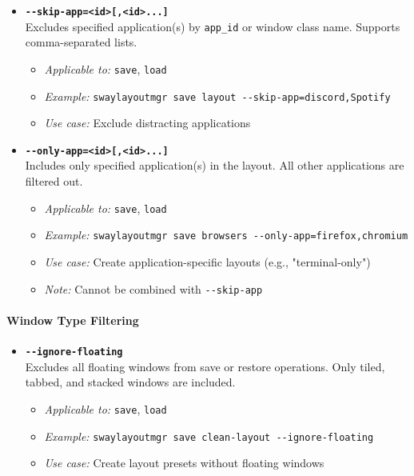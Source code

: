 \begin{itemize}
    \item \textbf{\texttt{-{}-skip-app=<id>[,<id>...]}} \\
    Excludes specified application(s) by \texttt{app\_id} or window class name. Supports comma-separated lists.
    \begin{itemize}
        \item \textit{Applicable to:} \texttt{save}, \texttt{load}
        \item \textit{Example:} \texttt{swaylayoutmgr save layout -{}-skip-app=discord,Spotify}
        \item \textit{Use case:} Exclude distracting applications
    \end{itemize}

    \item \textbf{\texttt{-{}-only-app=<id>[,<id>...]}} \\
    Includes only specified application(s) in the layout. All other applications are filtered out.
    \begin{itemize}
        \item \textit{Applicable to:} \texttt{save}, \texttt{load}
        \item \textit{Example:} \texttt{swaylayoutmgr save browsers -{}-only-app=firefox,chromium}
        \item \textit{Use case:} Create application-specific layouts (e.g., "terminal-only")
        \item \textit{Note:} Cannot be combined with \texttt{-{}-skip-app}
    \end{itemize}
\end{itemize}

\paragraph{Window Type Filtering}

\begin{itemize}
    \item \textbf{\texttt{-{}-ignore-floating}} \\
    Excludes all floating windows from save or restore operations. Only tiled, tabbed, and stacked windows are included.
    \begin{itemize}
        \item \textit{Applicable to:} \texttt{save}, \texttt{load}
        \item \textit{Example:} \texttt{swaylayoutmgr save clean-layout -{}-ignore-floating}
        \item \textit{Use case:} Create layout presets without floating windows
    \end{itemize}
\end{itemize}


